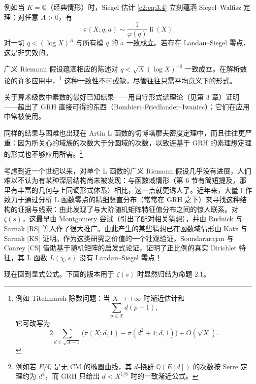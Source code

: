 例如当 $K=\mathbb{Q}$（经典情形）时，Siegel 估计 \eqref{c2:eq:3.4} 立刻蕴涵 Siegel--Walfisz 定理：对任意 $A>0$，有
\[
\pi(X;q,a)\sim\frac{1}{\varphi(q)}\operatorname{li}(X)
\]
对一切 $q<(\log X)^A$ 与所有模 $q$ 的 $a$ 一致成立。若存在 Landau--Siegel 零点，这是非实效的。

广义 Riemann 假设蕴涵相应的陈述对 $q<\sqrt{X}(\log X)^{-2}$ 一致成立。在解析数论的许多应用中，\footnote{例如 Titchmarsh 除数问题：当 $X\to+\infty$ 时渐近估计和
\[
\sum_{p\le X}d(p-1),
\]
它可改写为
\[
2\sum_{d\le\sqrt{X-1}}\bigl(\pi(X;d,1)-\pi(d^2+1;d,1)\bigr)+O(\sqrt{X}).
\]} 这种一致性不可或缺，尽管往往只需平均意义下的形式。

关于算术级数中素数的最好已知结果——用自守形式谱理论（见第 3 章）证明——超出了 GRH 直接可得的东西（Bombieri--Friedlander--Iwaniec）；它们在应用中常被使用。

同样的结果与困难也出现在 Artin L 函数的切博塔廖夫密度定理中，而且往往更严重：因为所关心的域族的次数大于分圆域的次数，以致连基于 GRH 的素理想定理的形式也不够应用所需。\footnote{例如若 $E/\mathbb{Q}$ 是无 CM 的椭圆曲线，其 $d$-挠群 $\mathbb{Q}(E[d])$ 的次数按 Serre 定理约为 $d^4$，而 GRH 只给出 $d<X^{1/8}$ 时的一致渐近公式。}

考虑到近一个世纪以来，对单个 L 函数的广义 Riemann 假设几乎没有进展，人们难以不认为有某种深层结构尚未被发现：与函数域情形（第 6 节有简短提及，那里有丰富的几何与上同调形式体系）相比，这一点就更诱人了。近年来，大量工作致力于通过分析 L 函数零点的精细竖直分布（常常在 GRH 之下）来寻找这种结构的证据与线索：由此发现了与大阶随机矩阵特征值分布之间的惊人联系。对 $\zeta(s)$，这最早由 Montgomery 尝试（引出了配对相关猜想），并由 Rudnick 与 Sarnak [RS] 等人作了很大推广。由此产生的某些猜想已在函数域情形由 Katz 与 Sarnak [KS] 证明。作为这类研究之价值的一个壮观验证，Soundararajan 与 Conrey [CS] 借助基于随机矩阵的启发式论证，证明了正比例的真实 Dirichlet 特征，其 L 函数 $L(\chi,s)$ 没有 Landau--Siegel 零点！

现在回到显式公式。下面的版本用于 $\zeta(s)$ 时显然归结为命题 2.1。

